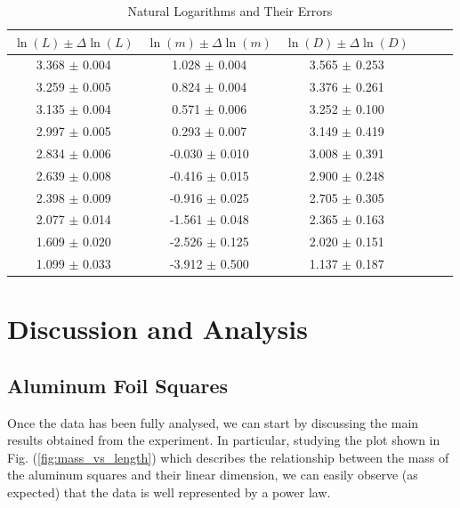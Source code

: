 \documentclass[a4paper,12pt]{article}
\begin{document}
\begin{table}[!ht]
    \centering
    \begin{tabular}{|c|c|c|c|c|c|}
    \hline
        \( \ln(L) \pm \Delta \ln(L) \) & \( \ln(m) \pm \Delta \ln(m) \) & \( \ln(D) \pm \Delta \ln(D) \) \\ \hline
        3.368 \(\pm\) 0.004 & 1.028 \(\pm\) 0.004 & 3.565 \(\pm\) 0.253 \\ \hline
        3.259 \(\pm\) 0.005 & 0.824 \(\pm\) 0.004 & 3.376 \(\pm\) 0.261 \\ \hline
        3.135 \(\pm\) 0.004 & 0.571 \(\pm\) 0.006 & 3.252 \(\pm\) 0.100 \\ \hline
        2.997 \(\pm\) 0.005 & 0.293 \(\pm\) 0.007 & 3.149 \(\pm\) 0.419 \\ \hline
        2.834 \(\pm\) 0.006 & -0.030 \(\pm\) 0.010 & 3.008 \(\pm\) 0.391 \\ \hline
        2.639 \(\pm\) 0.008 & -0.416 \(\pm\) 0.015 & 2.900 \(\pm\) 0.248 \\ \hline
        2.398 \(\pm\) 0.009 & -0.916 \(\pm\) 0.025 & 2.705 \(\pm\) 0.305 \\ \hline
        2.077 \(\pm\) 0.014 & -1.561 \(\pm\) 0.048 & 2.365 \(\pm\) 0.163 \\ \hline
        1.609 \(\pm\) 0.020 & -2.526 \(\pm\) 0.125 & 2.020 \(\pm\) 0.151 \\ \hline
        1.099 \(\pm\) 0.033 & -3.912 \(\pm\) 0.500 & 1.137 \(\pm\) 0.187 \\ \hline
    \end{tabular}
    \caption{Natural Logarithms and Their Errors}
    \label{tab:ln_errors}
\end{table}


\section{Discussion and Analysis}

\subsection{Aluminum Foil Squares}
\par Once the data has been fully analysed, we can start by discussing the main results obtained from the experiment. 
In particular, studying the plot shown in Fig. (\ref{fig:mass_vs_length}) which describes the relationship between the mass of the aluminum 
squares and their linear dimension, we can easily observe (as expected) that the data is well represented by a power law.
\end{document}
